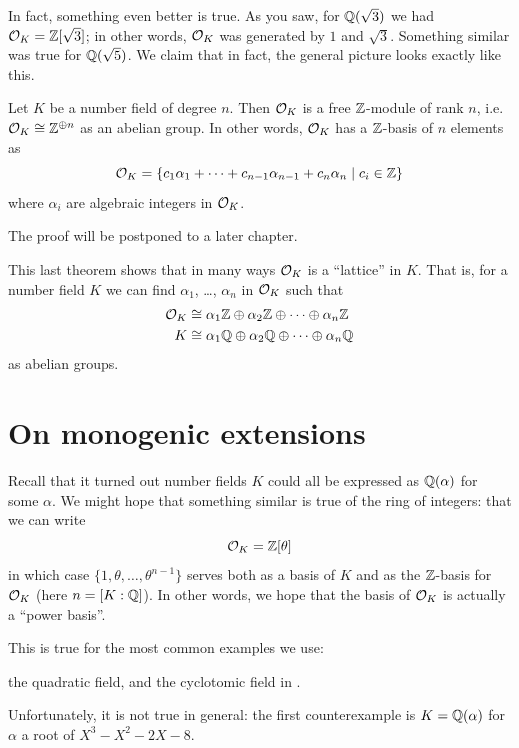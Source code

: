 In fact, something even better is true.
As you saw, for $\mathbb Q(\sqrt 3)$ we had $\mathcal O_K = \mathbb Z[\sqrt 3]$;
in other words, $\mathcal O_K$ was generated by $1$ and $\sqrt 3$.
Something similar was true for $\mathbb Q(\sqrt 5)$.
We claim that in fact, the general picture looks exactly like this.

\begin{theorem}
	Let $K$ be a number field of degree $n$.
	Then $\mathcal O_K$ is a free $\mathbb Z$-module of rank $n$,
	i.e.\ $\mathcal O_K \cong \mathbb Z^{\oplus n}$ as an abelian group.
	In other words, $\mathcal O_K$ has a $\mathbb Z$-basis of $n$ elements as
	\[ \mathcal O_K = \left\{ c_1\alpha_1 + \dots
			+ c_{n-1}\alpha_{n-1} + c_n\alpha_n \mid c_i \in \mathbb Z \right\} \]
	where $\alpha_i$ are algebraic integers in $\mathcal O_K$.
	\label{thm:OK_free_Z_module}
\end{theorem}

The proof will be postponed to a later chapter.

This last theorem shows that in many ways $\mathcal O_K$ is a ``lattice'' in $K$.
That is, for a number field $K$ we can find $\alpha_1$, \dots, $\alpha_n$
in $\mathcal O_K$ such that
\begin{align*}
	\mathcal O_K &\cong \alpha_1\mathbb Z \oplus \alpha_2\mathbb Z \oplus \dots \oplus \alpha_n\mathbb Z \\
	K &\cong \alpha_1\mathbb Q \oplus \alpha_2\mathbb Q \oplus \dots \oplus \alpha_n\mathbb Q
\end{align*}
as abelian groups.

\section{On monogenic extensions}
Recall that it turned out number fields $K$ could all be
expressed as $\mathbb Q(\alpha)$ for some $\alpha$.
We might hope that something similar is true of the ring of integers:
that we can write \[ \mathcal O_K = \mathbb Z[\theta] \]
in which case $\{1, \theta, \dots, \theta^{n-1}\}$
serves both as a basis of $K$ and as the $\mathbb Z$-basis for $\mathcal O_K$ (here $n = [K:\mathbb Q]$).
In other words, we hope that the basis of $\mathcal O_K$ is actually a ``power basis''.

This is true for the most common examples we use:
\begin{itemize}
	\ii the quadratic field, and
	\ii the cyclotomic field in .
\end{itemize}
Unfortunately, it is not true in general:
the first counterexample is $K=\mathbb Q(\alpha)$ for $\alpha$ a root of $X^3-X^2-2X-8$.


